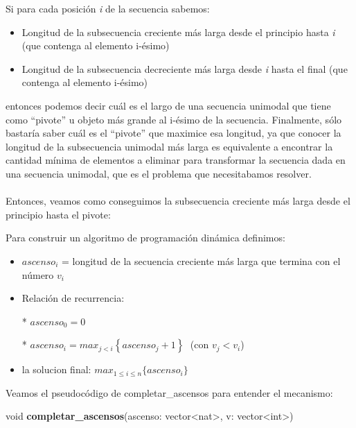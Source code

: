 Si para cada posición \textit{i} de la secuencia sabemos:
\begin{itemize}
	\item Longitud de la subsecuencia creciente más larga desde el principio hasta \textit{i} (que contenga al elemento i-ésimo)
	\item Longitud de la subsecuencia decreciente más larga desde \textit{i} hasta el final (que contenga al elemento i-ésimo)
\end{itemize}

entonces podemos decir cuál es el largo de una secuencia unimodal que tiene como ``pivote'' u objeto más grande al i-ésimo de la secuencia. Finalmente, sólo bastaría saber cuál es el ``pivote'' que maximice esa longitud, ya que conocer la longitud de la subsecuencia unimodal más larga es equivalente a encontrar la cantidad mínima de elementos a eliminar para transformar la secuencia dada en una secuencia unimodal, que es el problema que necesitabamos resolver.

\paragraph{}
Entonces, veamos como conseguimos la subsecuencia creciente más larga desde el principio hasta el pivote:


Para construir un algoritmo de programación dinámica definimos:
\begin{itemize}
	
\item $ascenso_i$ = longitud de la secuencia creciente más larga que termina con el número $v_i$
	
\item Relación de recurrencia:	 
  
  * $ascenso_0 = 0$

  * $ascenso_i  = max_{j<i} \left\lbrace ascenso_j + 1\right\rbrace  \;      $ (con $ v_j < v_i  $)

	
\item la solucion final: $max_{1\leq i\leq n} \{ascenso_i\}$
\end{itemize}
 \vspace*{0.5cm}
Veamos el pseudocódigo de completar\_ascensos para entender el mecanismo:
\vspace*{1cm}

void  \textbf{completar\_ascensos}(ascenso: vector<nat>, v: vector<int>)\\
	\begin{algorithm}[H]
\BlankLine		
  \end{algorithm}

